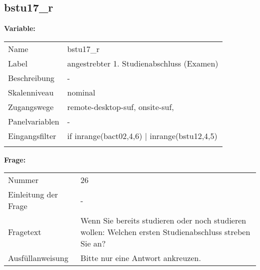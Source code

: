 	
	
	\subsection{bstu17\_r}
	\label{subSection:bstu17_r}

	\noindent\textbf{Variable:}\\
		\begin{tabular}{lL{11.3cm}}
			\label{tableVariable:bstu17_r}
			Name & bstu17\_r \\
			Label & angestrebter 1. Studienabschluss (Examen) \\
			Beschreibung & - \\
			Skalenniveau & nominal \\
			Zugangswege &
				remote-desktop-suf,
				onsite-suf,
 \\
			Panelvariablen & -
			 \\
			Eingangsfilter & if inrange(bact02,4,6) |  inrange(bstu12,4,5) \\
 \\
		\end{tabular}

		\vspace*{1 cm}
		\noindent\textbf{Frage:}\\
		\begin{tabular}{lL{11.3cm}}
			\label{tableQuestion:bstu17_r}
			Nummer & 26 \\
			Einleitung der Frage & - \\
			Fragetext & Wenn Sie bereits studieren oder noch studieren wollen: Welchen ersten Studienabschluss streben Sie an? \\
			Ausfüllanweisung & Bitte nur eine Antwort ankreuzen. \\
		\end{tabular}





